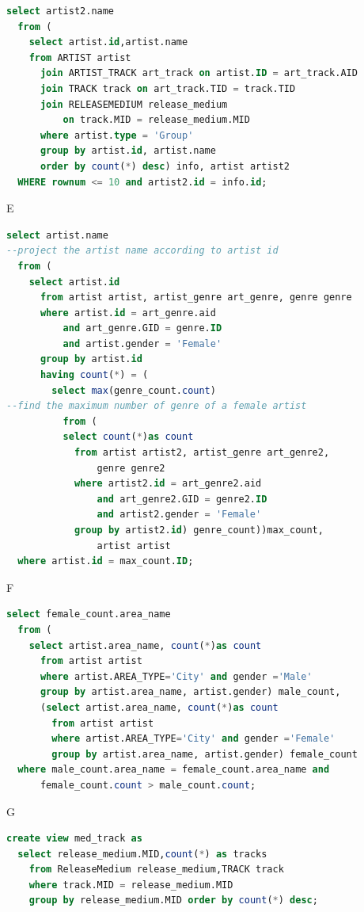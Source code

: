 \documentclass[11pt]{article} %
\begin{document}
{\begin{lstlisting}[language=SQL, keywordstyle=\color{blue!70},
commentstyle=\color{red!50!green!50!blue!50},
rulesepcolor=\color{red!20!green!20!blue!20},
frame=shadowbox]
select artist2.name
  from (
    select artist.id,artist.name
    from ARTIST artist
      join ARTIST_TRACK art_track on artist.ID = art_track.AID
      join TRACK track on art_track.TID = track.TID
      join RELEASEMEDIUM release_medium
          on track.MID = release_medium.MID
      where artist.type = 'Group'
      group by artist.id, artist.name
      order by count(*) desc) info, artist artist2
  WHERE rownum <= 10 and artist2.id = info.id;
\end{lstlisting}
E
\begin{lstlisting}[language=SQL, keywordstyle=\color{blue!70},
commentstyle=\color{red!50!green!50!blue!50},
rulesepcolor=\color{red!20!green!20!blue!20},
frame=shadowbox]
select artist.name
--project the artist name according to artist id
  from (
    select artist.id
      from artist artist, artist_genre art_genre, genre genre
      where artist.id = art_genre.aid
          and art_genre.GID = genre.ID
          and artist.gender = 'Female' 
      group by artist.id
      having count(*) = (
        select max(genre_count.count)
--find the maximum number of genre of a female artist
          from (
          select count(*)as count
            from artist artist2, artist_genre art_genre2,
                genre genre2
            where artist2.id = art_genre2.aid
                and art_genre2.GID = genre2.ID
                and artist2.gender = 'Female' 
            group by artist2.id) genre_count))max_count,
                artist artist
  where artist.id = max_count.ID;
\end{lstlisting}
F
\begin{lstlisting}[language=SQL, keywordstyle=\color{blue!70},
commentstyle=\color{red!50!green!50!blue!50},
rulesepcolor=\color{red!20!green!20!blue!20},
frame=shadowbox]
select female_count.area_name
  from (
    select artist.area_name, count(*)as count
      from artist artist
      where artist.AREA_TYPE='City' and gender ='Male'
      group by artist.area_name, artist.gender) male_count,
      (select artist.area_name, count(*)as count
        from artist artist
        where artist.AREA_TYPE='City' and gender ='Female'
        group by artist.area_name, artist.gender) female_count
  where male_count.area_name = female_count.area_name and 
      female_count.count > male_count.count;
\end{lstlisting}
G
\begin{lstlisting}[language=SQL, keywordstyle=\color{blue!70},
commentstyle=\color{red!50!green!50!blue!50},
rulesepcolor=\color{red!20!green!20!blue!20},
frame=shadowbox]
create view med_track as
  select release_medium.MID,count(*) as tracks
    from ReleaseMedium release_medium,TRACK track
    where track.MID = release_medium.MID
    group by release_medium.MID order by count(*) desc;


\end{lstlisting}}
\end{document}
